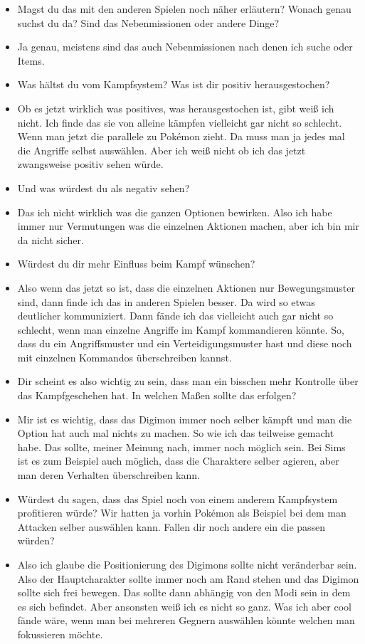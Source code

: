 {\begin{itemize}[]
    \item {} Magst du das mit den anderen Spielen noch näher erläutern? Wonach genau suchst du da? Sind das Nebenmissionen oder andere Dinge?
    \item {} Ja genau, meistens sind das auch Nebenmissionen nach denen ich suche oder Items. 
    \item {} Was hältst du vom Kampfsystem? Was ist dir positiv herausgestochen?
    \item {} Ob es jetzt wirklich was positives, was herausgestochen ist, gibt weiß ich nicht. Ich finde das sie von alleine kämpfen vielleicht gar nicht so schlecht. Wenn man jetzt die parallele zu Pokémon zieht. Da muss man ja jedes mal die Angriffe selbst auswählen. Aber ich weiß nicht ob ich das jetzt zwangsweise positiv sehen würde.
    \item {} Und was würdest du als negativ sehen?
    \item {} Das ich nicht wirklich was die ganzen Optionen bewirken. Also ich habe immer nur Vermutungen was die einzelnen Aktionen machen, aber ich bin mir da nicht sicher. 
    \item {} Würdest du dir mehr Einfluss beim Kampf wünschen?
    \item {} Also wenn das jetzt so ist, dass die einzelnen Aktionen nur Bewegungsmuster sind, dann finde ich das in anderen Spielen besser. Da wird so etwas deutlicher kommuniziert. Dann fände ich das vielleicht auch gar nicht so schlecht, wenn man einzelne Angriffe im Kampf kommandieren könnte. So, dass du ein Angriffsmuster und ein Verteidigungsmuster hast und diese noch mit einzelnen Kommandos überschreiben kannst. 
    \item {} Dir scheint es also wichtig zu sein, dass man ein bisschen mehr Kontrolle über das Kampfgeschehen hat. In welchen Maßen sollte das erfolgen?
    \item {} Mir ist es wichtig, dass das Digimon immer noch selber kämpft und man die Option hat auch mal nichts zu machen. So wie ich das teilweise gemacht habe. Das sollte, meiner Meinung nach, immer noch möglich sein. Bei Sims ist es zum Beispiel auch möglich, dass die Charaktere selber agieren, aber man deren Verhalten überschreiben kann.
    \item {} Würdest du sagen, dass das Spiel noch von einem anderem Kampfsystem profitieren würde? Wir hatten ja vorhin Pokémon als Beispiel bei dem man Attacken selber auswählen kann. Fallen dir noch andere ein die passen würden?
    \item {} Also ich glaube die Positionierung des Digimons sollte nicht veränderbar sein. Also der Hauptcharakter sollte immer noch am Rand stehen und das Digimon sollte sich frei bewegen. Das sollte dann abhängig von den Modi sein in dem es sich befindet. Aber ansonsten weiß ich es nicht so ganz. Was ich aber cool fände wäre, wenn man bei mehreren Gegnern auswählen könnte welchen man fokussieren möchte.
\end{itemize}}
\nolinenumbers